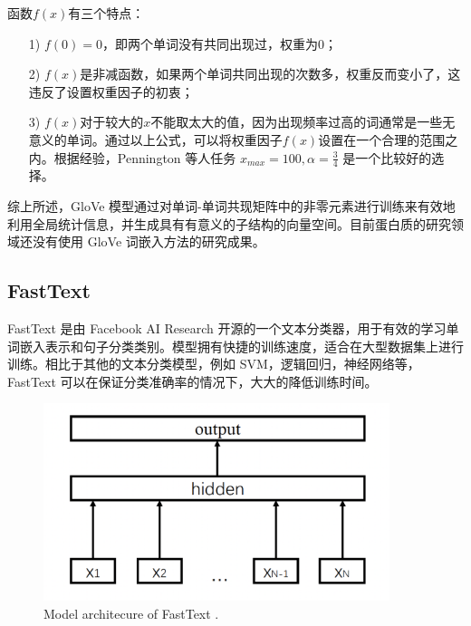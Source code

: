 函数$f(x)$有三个特点：
\begin{itemize}
    \item [1)] 
    $f(0) = 0$，即两个单词没有共同出现过，权重为0； 
    \item [2)]
    $f(x)$是非减函数，如果两个单词共同出现的次数多，权重反而变小了，这违反了设置权重因子的初衷；
    \item [3)]
    $f(x)$对于较大的$x$不能取太大的值，因为出现频率过高的词通常是一些无意义的单词。通过以上公式，可以将权重因子$f(x)$设置在一个合理的范围之内。根据经验，Pennington 等人任务 $x_{max} = 100, \alpha = \frac{3}{4}$ 是一个比较好的选择。 
  \end{itemize}

综上所述，GloVe 模型通过对单词-单词共现矩阵中的非零元素进行训练来有效地利用全局统计信息，并生成具有有意义的子结构的向量空间。目前蛋白质的研究领域还没有使用 GloVe 词嵌入方法的研究成果。

\subsection{FastText}

FastText \cite{joulin2016bag} 是由 Facebook AI Research 开源的一个文本分类器，用于有效的学习单词嵌入表示和句子分类类别。模型拥有快捷的训练速度，适合在大型数据集上进行训练。相比于其他的文本分类模型，例如 SVM，逻辑回归，神经网络等，FastText 可以在保证分类准确率的情况下，大大的降低训练时间。


\begin{figure}[!htp]
\centering
\includegraphics[width=0.9\textwidth]  {imgs/fasttext.png} \\
    {Model architecure of FastText \cite{joulin2016bag}.}
\label{fig:fasttext}
\end{figure}

